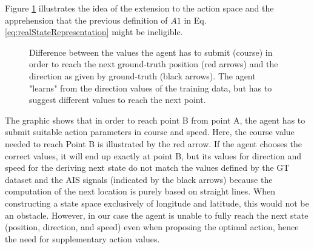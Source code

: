 Figure \ref{fig:explanation} illustrates the idea of the extension to the action space and the apprehension that the previous definition of $A1$ in Eq. \ref{eq:realStateRepresentation} might be ineligible. 
\begin{figure}[H]
    \centering
    
    \caption{Difference between the values the agent has to submit (course) in order to reach the next ground-truth position (red arrows) and the direction as given by ground-truth (black arrows). The agent "learns" from the direction values of the training data, but has to suggest different values to reach the next point.}
    \label{fig:explanation}
\end{figure}


The graphic shows that in order to reach point B from point A, the agent has to submit suitable action parameters in course and speed. Here, the course value needed to reach Point B is illustrated by the red arrow. If the agent chooses the correct values, it will end up exactly at point B, but its values for direction and speed for the deriving next state do not match the values defined by the GT dataset and the AIS signals (indicated by the black arrows) because the computation of the next location is purely based on straight lines. When constructing a state space exclusively of longitude and latitude, this would not be an obstacle. However, in our case the agent is unable to fully reach the next state (position, direction, and speed) even when proposing the optimal action, hence the need for supplementary action values.